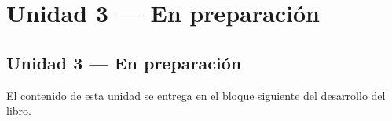 %
\part{Unidad 3 --- En preparaci\'on}
\label{part:unidad3}

\chapter*{Unidad 3 --- En preparaci\'on}

El contenido de esta unidad se entrega en el bloque siguiente del desarrollo del libro.

\cleardoublepage
